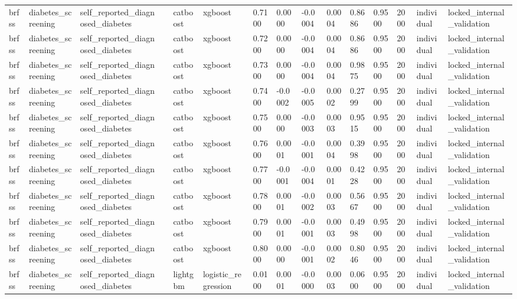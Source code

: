 \begin{tabular}{lllllllllllllll}
brfss & diabetes\_screening & self\_reported\_diagnosed\_diabetes &  & catboost & xgboost & 0.7100 & 0.0000 & -0.0004 & 0.0004 & 0.8686 & 0.9500 & 2000 & individual & locked\_internal\_validation \\
brfss & diabetes\_screening & self\_reported\_diagnosed\_diabetes &  & catboost & xgboost & 0.7200 & 0.0000 & -0.0004 & 0.0004 & 0.8686 & 0.9500 & 2000 & individual & locked\_internal\_validation \\
brfss & diabetes\_screening & self\_reported\_diagnosed\_diabetes &  & catboost & xgboost & 0.7300 & 0.0000 & -0.0004 & 0.0004 & 0.9875 & 0.9500 & 2000 & individual & locked\_internal\_validation \\
brfss & diabetes\_screening & self\_reported\_diagnosed\_diabetes &  & catboost & xgboost & 0.7400 & -0.0002 & -0.0005 & 0.0002 & 0.2799 & 0.9500 & 2000 & individual & locked\_internal\_validation \\
brfss & diabetes\_screening & self\_reported\_diagnosed\_diabetes &  & catboost & xgboost & 0.7500 & 0.0000 & -0.0003 & 0.0003 & 0.9515 & 0.9500 & 2000 & individual & locked\_internal\_validation \\
brfss & diabetes\_screening & self\_reported\_diagnosed\_diabetes &  & catboost & xgboost & 0.7600 & 0.0001 & -0.0001 & 0.0004 & 0.3998 & 0.9500 & 2000 & individual & locked\_internal\_validation \\
brfss & diabetes\_screening & self\_reported\_diagnosed\_diabetes &  & catboost & xgboost & 0.7700 & -0.0001 & -0.0004 & 0.0001 & 0.4228 & 0.9500 & 2000 & individual & locked\_internal\_validation \\
brfss & diabetes\_screening & self\_reported\_diagnosed\_diabetes &  & catboost & xgboost & 0.7800 & 0.0001 & -0.0002 & 0.0003 & 0.5667 & 0.9500 & 2000 & individual & locked\_internal\_validation \\
brfss & diabetes\_screening & self\_reported\_diagnosed\_diabetes &  & catboost & xgboost & 0.7900 & 0.0001 & -0.0001 & 0.0003 & 0.4998 & 0.9500 & 2000 & individual & locked\_internal\_validation \\
brfss & diabetes\_screening & self\_reported\_diagnosed\_diabetes &  & catboost & xgboost & 0.8000 & 0.0000 & -0.0001 & 0.0002 & 0.8046 & 0.9500 & 2000 & individual & locked\_internal\_validation \\
brfss & diabetes\_screening & self\_reported\_diagnosed\_diabetes &  & lightgbm & logistic\_regression & 0.0100 & 0.0001 & -0.0000 & 0.0003 & 0.0600 & 0.9500 & 2000 & individual & locked\_internal\_validation \\

\end{tabular}
